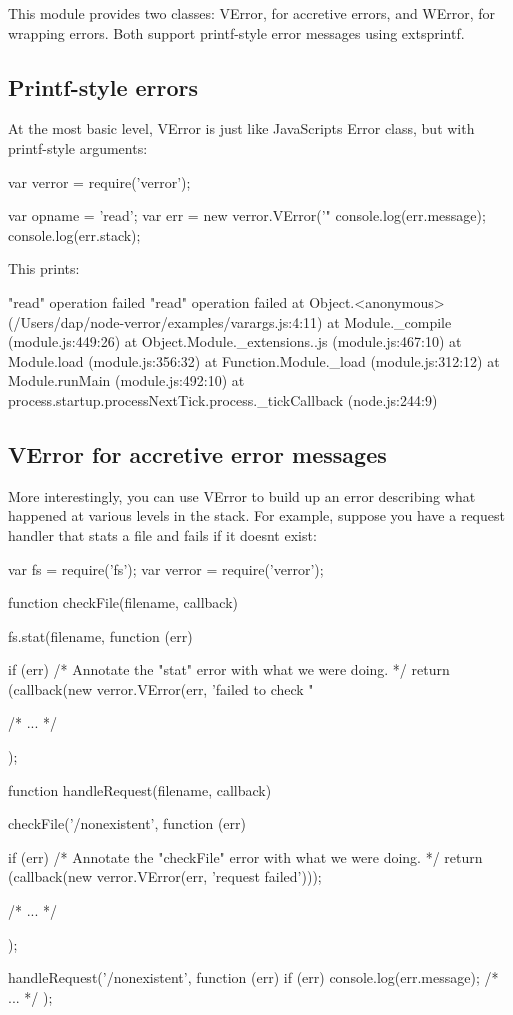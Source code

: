 This module provides two classes\+: V\+Error, for accretive errors, and W\+Error, for wrapping errors. Both support printf-\/style error messages using extsprintf.

\subsection*{Printf-\/style errors}

At the most basic level, V\+Error is just like Java\+Script\textquotesingle{}s Error class, but with printf-\/style arguments\+: \begin{DoxyVerb}var verror = require('verror');

var opname = 'read';
var err = new verror.VError('"%
console.log(err.message);
console.log(err.stack);
\end{DoxyVerb}


This prints\+: \begin{DoxyVerb}"read" operation failed
"read" operation failed
    at Object.<anonymous> (/Users/dap/node-verror/examples/varargs.js:4:11)
    at Module._compile (module.js:449:26)
    at Object.Module._extensions..js (module.js:467:10)
    at Module.load (module.js:356:32)
    at Function.Module._load (module.js:312:12)
    at Module.runMain (module.js:492:10)
    at process.startup.processNextTick.process._tickCallback (node.js:244:9)
\end{DoxyVerb}


\subsection*{V\+Error for accretive error messages}

More interestingly, you can use V\+Error to build up an error describing what happened at various levels in the stack. For example, suppose you have a request handler that stats a file and fails if it doesn\textquotesingle{}t exist\+: \begin{DoxyVerb}var fs = require('fs');
var verror = require('verror');

function checkFile(filename, callback) {
    fs.stat(filename, function (err) {
        if (err)
    /* Annotate the "stat" error with what we were doing. */
        return (callback(new verror.VError(err,
        'failed to check "%

    /* ... */
    });
}

function handleRequest(filename, callback) {
    checkFile('/nonexistent', function (err) {
        if (err) {
            /* Annotate the "checkFile" error with what we were doing. */
            return (callback(new verror.VError(err, 'request failed')));
        }

        /* ... */
    });
}

handleRequest('/nonexistent', function (err) {
if (err)
    console.log(err.message);
/* ... */
});
\end{DoxyVerb}



